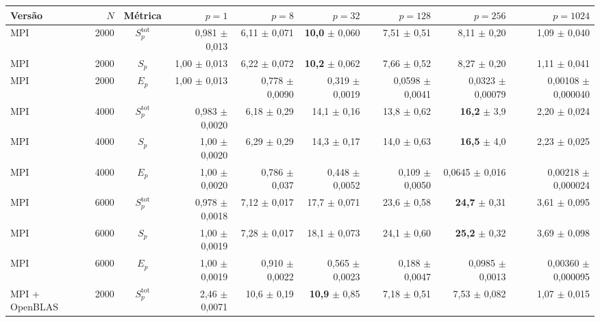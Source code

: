 \documentclass[Portugues]{ic-tese-v3}
\DeclareRobustCommand{\_}{\textunderscore\allowbreak} %
\begin{document}
\begin{table}[H]
\centering\scriptsize
\renewcommand{\arraystretch}{1.05}\setlength{\tabcolsep}{3.5pt}
\begin{tabular}{|l|r|c|r|r|r|r|r|r|}
\hline
\textbf{Versão} & \textbf{$N$} & \textbf{Métrica} & \textbf{$p=1$} & \textbf{$p=8$} & \textbf{$p=32$} & \textbf{$p=128$} & \textbf{$p=256$} & \textbf{$p=1024$} \\
\hline\hline
MPI & 2000 & $S^{\mathrm{tot}}_p$ & 0,981 $\pm$ 0,013 & 6,11 $\pm$ 0,071 & \textbf{10,0} $\pm$ 0,060 & 7,51 $\pm$ 0,51 & 8,11 $\pm$ 0,20 & 1,09 $\pm$ 0,040 \\ \hline
MPI & 2000 & $S_p$ & 1,00 $\pm$ 0,013 & 6,22 $\pm$ 0,072 & \textbf{10,2} $\pm$ 0,062 & 7,66 $\pm$ 0,52 & 8,27 $\pm$ 0,20 & 1,11 $\pm$ 0,041 \\ \hline
MPI & 2000 & $E_p$ & 1,00 $\pm$ 0,013 & 0,778 $\pm$ 0,0090 & 0,319 $\pm$ 0,0019 & 0,0598 $\pm$ 0,0041 & 0,0323 $\pm$ 0,00079 & 0,00108 $\pm$ 0,000040 \\ \hline
MPI & 4000 & $S^{\mathrm{tot}}_p$ & 0,983 $\pm$ 0,0020 & 6,18 $\pm$ 0,29 & 14,1 $\pm$ 0,16 & 13,8 $\pm$ 0,62 & \textbf{16,2} $\pm$ 3,9 & 2,20 $\pm$ 0,024 \\ \hline
MPI & 4000 & $S_p$ & 1,00 $\pm$ 0,0020 & 6,29 $\pm$ 0,29 & 14,3 $\pm$ 0,17 & 14,0 $\pm$ 0,63 & \textbf{16,5} $\pm$ 4,0 & 2,23 $\pm$ 0,025 \\ \hline
MPI & 4000 & $E_p$ & 1,00 $\pm$ 0,0020 & 0,786 $\pm$ 0,037 & 0,448 $\pm$ 0,0052 & 0,109 $\pm$ 0,0050 & 0,0645 $\pm$ 0,016 & 0,00218 $\pm$ 0,000024 \\ \hline
MPI & 6000 & $S^{\mathrm{tot}}_p$ & 0,978 $\pm$ 0,0018 & 7,12 $\pm$ 0,017 & 17,7 $\pm$ 0,071 & 23,6 $\pm$ 0,58 & \textbf{24,7} $\pm$ 0,31 & 3,61 $\pm$ 0,095 \\ \hline
MPI & 6000 & $S_p$ & 1,00 $\pm$ 0,0019 & 7,28 $\pm$ 0,017 & 18,1 $\pm$ 0,073 & 24,1 $\pm$ 0,60 & \textbf{25,2} $\pm$ 0,32 & 3,69 $\pm$ 0,098 \\ \hline
MPI & 6000 & $E_p$ & 1,00 $\pm$ 0,0019 & 0,910 $\pm$ 0,0022 & 0,565 $\pm$ 0,0023 & 0,188 $\pm$ 0,0047 & 0,0985 $\pm$ 0,0013 & 0,00360 $\pm$ 0,000095 \\ \hline\hline
MPI + OpenBLAS & 2000 & $S^{\mathrm{tot}}_p$ & 2,46 $\pm$ 0,0071 & 10,6 $\pm$ 0,19 & \textbf{10,9} $\pm$ 0,85 & 7,18 $\pm$ 0,51 & 7,53 $\pm$ 0,082 & 1,07 $\pm$ 0,015 \\ \hline

\end{tabular}
\end{table}
\end{document}
